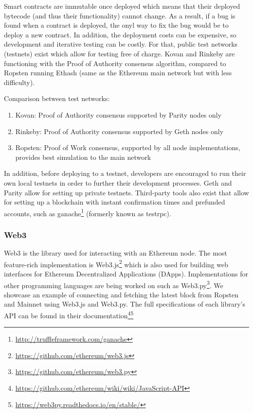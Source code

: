 Smart contracts are immutable once deployed which means that their deployed bytecode (and thus their functionality) cannot change. As a result, if a bug is found when a contract is deployed, the onyl way to fix the bug would be to deploy a new contract. In addition, the deployment costs can be expensive, so development and iterative testing can be costly. For that, public test networks (testnets) exist which allow for testing free of charge. Kovan and Rinkeby are functioning with the Proof of Authority \cite{poa} consensus algorithm, compared to Ropsten running Ethash \cite{ethash} (same as the Ethereum main network but with less difficulty). 

Comparison between test networks:
\begin{enumerate}
    \item Kovan: Proof of Authority consensus supported by Parity nodes only
    \item Rinkeby: Proof of Authority consensus supported by Geth nodes only
    \item Ropsten: Proof of Work consensus, supported by all node implementations, provides best simulation to the main network 
\end{enumerate}

In addition, before deploying to a testnet, developers are encouraged to run their own local testnets in order to further their development processes. Geth and Parity allow for setting up private testnets. Third-party tools also exist that allow for setting up a blockchain with instant confirmation times and prefunded accounts, such as ganache\footnote{\url{http://truffleframework.com/ganache}} (formerly known as testrpc).


\subsubsection{Web3}
Web3 is the library used for interacting with an Ethereum node. The most feature-rich implementation is Web3.js\footnote{\url{https://github.com/ethereum/web3.js}} which is also used for building web interfaces for Ethereum Decentralized Applications (DApps). Implementations for other programming languages are being worked on such as Web3.py\footnote{\url{https://github.com/ethereum/web3.py}}. We showcase an example of connecting and fetching the latest block from Ropsten and Mainnet using Web3.js and Web3.py. The full specifications of each library's API can be found in their documentation\footnote{\url{https://github.com/ethereum/wiki/wiki/JavaScript-API}}\footnote{\url{https://web3py.readthedocs.io/en/stable/}}


